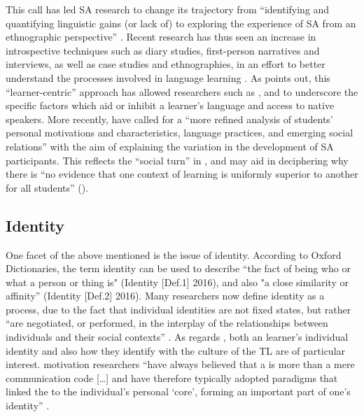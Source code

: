 \documentclass[output=paper]{langsci/langscibook}
\begin{document}
This call has led SA research to change its trajectory from “identifying and quantifying {linguistic} gains (or lack of) to exploring the experience of SA from an ethnographic perspective” \citep[6]{Devlin2014studyabroad}. Recent research has thus seen an increase in introspective techniques such as diary studies, first-person narratives and interviews, as well as case studies and ethnographies, in an effort to better understand the processes involved in language learning \citep{Jackson2008b}. As \citet{Devlin2014studyabroad} points out, this “learner-centric” approach has allowed researchers such as \citet{Isabelli-García2006}, \citet{Jackson2008b} and \citet{Kinginger2004} to underscore the specific factors which aid or inhibit a learner’s language  and access to native speakers. More recently, \citet[134]{MitchellEtAl2015} have called for a “more refined analysis of students’ personal motivations and characteristics,  language practices, and emerging social relations” with the aim of explaining the variation in the  development of  SA participants. This  reflects the “social turn” in  \citep{Block2003}, and may aid in deciphering why there is “no evidence that one context of learning is uniformly superior to another for all students” (\citet[164]{CollentineFreed2004intro}). 



\subsection{Identity}


One facet of the above mentioned  is the issue of identity. According to Oxford Dictionaries, the term identity can be used to describe “the fact of being who or what a person or thing is" (Identity [Def.1] 2016), and also "a close similarity or affinity” (Identity [Def.2] 2016). Many researchers now define identity as a process, due to the fact that individual identities are not fixed states, but rather “are negotiated, or performed, in the interplay of the relationships between individuals and their social contexts” \citep[11]{Stockton2015}. As regards , both an  learner’s individual identity and also how they identify with the culture of the TL are of particular interest.  motivation researchers “have always believed that a  is more than a mere communication code […] and have therefore typically adopted paradigms that linked the  to the individual’s personal ‘core’, forming an important part of one’s identity” \citep[9]{DörnyeiUshioda2009}.
\end{document}
